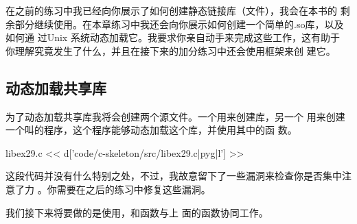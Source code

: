 在之前的练习中我已经向你展示了如何创建静态链接库（文件），我会在本书的
剩余部分继续使用。在本章练习中我还会向你展示如何创建一个简单的.so库，以及如何通
过Unix 系统动态加载它。我要求你亲自动手来完成这些工作，这有助于
你理解究竟发生了什么，并且在接下来的加分练习中还会使用框架来创
建它。

\subsection{动态加载共享库}

为了动态加载共享库我将会创建两个源文件。一个用来创建库，另一个
用来创建一个叫的程序，这个程序能够动态加载这个库，并使用其中的函
数。

\begin{code}{libex29.c}
<< d['code/c-skeleton/src/libex29.c|pyg|l'] >>
\end{code}

这段代码并没有什么特别之处，不过，我故意留下了一些漏洞来检查你是否集中注意了力
。你需要在之后的练习中修复这些漏洞。

我们接下来将要做的是使用，和函数与上
面的函数协同工作。

